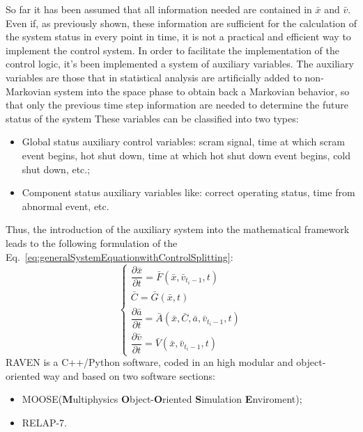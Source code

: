 \documentclass{mc2013}
\begin{document}
\label{sec:auxiliary}
So far it has been assumed that all information needed are contained in $\bar{x}$ and $\bar{v}$. Even if, as previously shown, these information are sufficient for the calculation of the system status in every point in time, it is not a practical and efficient way to implement the control system.
In order to facilitate the implementation of the control logic, it's been implemented a system of auxiliary variables.
The auxiliary variables are those that in statistical analysis are artificially added to non-Markovian system into the space phase to obtain back a Markovian behavior, so that only the previous time step information are needed to determine the future status of the system
These variables can be classified into two types: 
\begin{itemize}
\item Global status auxiliary control variables: scram signal, time at which scram event begins, hot shut down, time at which hot shut down event begins, cold shut down, etc.;
\item Component status auxiliary variables like: correct operating status, time from abnormal event, etc.
\end{itemize}
Thus, the introduction of the auxiliary system into the mathematical framework leads to the following formulation of the Eq.~\ref{eq:generalSystemEquationwithControlSplitting}:
\begin{equation}
\begin{cases} 
\dfrac{\partial \bar{x}}{\partial t} = \bar{F}(\bar{x},\bar{v}_{t_{i}-1},t) \\
\bar{C} = \bar{G}(\bar{x},t) \\ 
\dfrac{\partial \bar{a}}{\partial t} = \bar{A}(\bar{x},\bar{C},\bar{a},\bar{v}_{t_{i}-1},t) \\
\dfrac{\partial \bar{v}}{\partial t} = \bar{V}(\bar{x},\bar{v}_{t_{i}-1},t) 
\end{cases}
\label{eq:generalSystemEquationwithControlSplittingAndAux}
\end{equation}
\label{sec:softwareStructure}
RAVEN is a C++/Python software, coded in an high modular and object-oriented way and based on two software sections:
\begin{itemize}
\item MOOSE(\textbf{M}ultiphysics \textbf{O}bject-\textbf{O}riented \textbf{S}imulation \textbf{E}nviroment);
\item RELAP-7.
\end{itemize}
\end{document}

